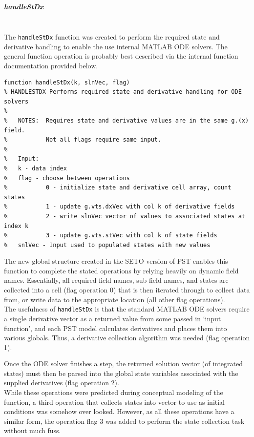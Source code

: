 \documentclass[12pt]{article}
\begin{document}
\subparagraph{handleStDx} \ \\
The \verb|handleStDx| function was created to perform the required state and derivative handling to enable the use internal MATLAB ODE solvers.
The general function operation is probably best described via the internal function documentation provided below.

\begin{verbatim}
function handleStDx(k, slnVec, flag)
% HANDLESTDX Performs required state and derivative handling for ODE solvers
%
%   NOTES:  Requires state and derivative values are in the same g.(x) field.
%           Not all flags require same input.
%
%   Input:
%   k - data index
%   flag - choose between operations
%           0 - initialize state and derivative cell array, count states
%           1 - update g.vts.dxVec with col k of derivative fields
%           2 - write slnVec vector of values to associated states at index k
%           3 - update g.vts.stVec with col k of state fields
%   snlVec - Input used to populated states with new values
\end{verbatim}

The new global structure created in the SETO version of PST enables this function to complete the stated operations by relying heavily on dynamic field names. 
Essentially, all required field names, sub-field names, and states are collected into a cell (flag operation 0) that is then iterated through to collect data from, or write data to the appropriate location (all other flag operations).\\

The usefulness of \verb|handleStDx| is that the standard MATLAB ODE solvers require a single derivative vector as a returned value from some passed in `input function', and each PST model calculates derivatives and places them into various globals. 
Thus, a derivative collection algorithm was needed (flag operation 1).

Once the ODE solver finishes a step, the returned solution vector (of integrated states) must then be parsed into the global state variables associated with the supplied derivatives (flag operation 2).\\

While these operations were predicted during conceptual modeling of the function, a third operation that collects states into vector to use as initial conditions was somehow over looked.
However, as all these operations have a similar form, the operation flag 3 was added to perform the state collection task without much fuss.\\
\end{document}
